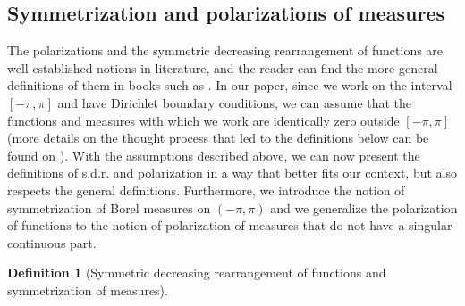 \documentclass[11pt]{amsart}
\DeclareMathOperator*{\esssup}{ess\,sup}
\DeclareMathOperator*{\essinf}{ess\,inf}
\newtheorem{definition}[theorem]{Definition}
\numberwithin{equation}{section}
\begin{document}
\subsection{Symmetrization and polarizations of measures}
The polarizations and the symmetric decreasing rearrangement of functions are well established notions in literature, and the reader can find the more general definitions of them in books such as \cite{Baernstein}. In our paper, since we work on the interval \([-\pi,\pi]\) and have Dirichlet boundary conditions, we can assume that the functions and measures with which we work are identically zero outside \([-\pi,\pi]\) (more details on the thought process that led to the definitions below can be found on \cite{egw}). With the assumptions described above, we can now present the definitions of s.d.r. and polarization in a way that better fits our context, but also respects the general definitions. Furthermore, we introduce the notion of symmetrization of Borel measures on \((-\pi,\pi)\) and we generalize the polarization of functions to the notion of polarization of measures that do not have a singular continuous part.
\begin{definition}[Symmetric decreasing rearrangement of functions and symmetrization of measures]\label{sdr}\quad
{}
\end{definition}
\end{document}
